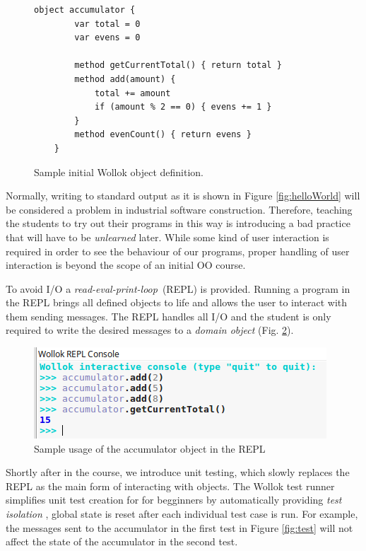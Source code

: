 \vspace{-3mm}
\begin{figure}[ht]
 \centering
 \begin{lstlisting}[language=Wollok]
	object accumulator {
		var total = 0
		var evens = 0
		
		method getCurrentTotal() { return total }
		method add(amount) { 
			total += amount 
			if (amount % 2 == 0) { evens += 1 }
		}
		method evenCount() { return evens }
	}\end{lstlisting}
\vspace{-3mm}
\caption{\small Sample initial Wollok object definition.}
\label{fig:helloWorld/wollok}
\end{figure}
\vspace{-3mm}

Normally, writing to standard output as it is shown in Figure \ref{fig:helloWorld} will be considered a problem in industrial software construction.
Therefore, teaching the students to try out their programs in this way is introducing a bad practice that will have to be \emph{unlearned} later.
While some kind of user interaction is required in order to see the behaviour of our programs, proper handling of user interaction is beyond the scope of an initial OO course.

To avoid I/O a \emph{read-eval-print-loop}~(REPL) is provided.
Running a program in the REPL brings all defined objects to life and allows the user to interact with them sending messages. 
The REPL handles all I/O and the student is only required to write the desired messages to a \emph{domain object} (\cf Fig. \ref{fig:repl}).

\vspace{-3mm}
\begin{figure}[ht]
 \centering
 \includegraphics[scale=0.55]{images/accumulator-repl.png}
\vspace{-3mm}
\caption{\small Sample usage of the accumulator object in the REPL}
\label{fig:repl}
\end{figure}

Shortly after in the course, we introduce unit testing, 
which slowly replaces the REPL as the main form of interacting with objects. 
The Wollok test runner simplifies unit test creation for for begginners by automatically providing \emph{test isolation} \cite{martin2008cleanCode},
\ie global state is reset after each individual test case is run.
For example, the messages sent to the accumulator in the first test in Figure \ref{fig:test} will not affect the state of the accumulator in the second test.

